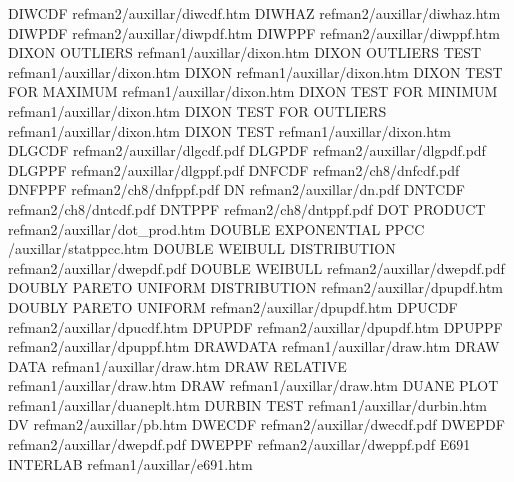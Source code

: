 DIWCDF                                  refman2/auxillar/diwcdf.htm
DIWHAZ                                  refman2/auxillar/diwhaz.htm
DIWPDF                                  refman2/auxillar/diwpdf.htm
DIWPPF                                  refman2/auxillar/diwppf.htm
DIXON OUTLIERS                          refman1/auxillar/dixon.htm
DIXON OUTLIERS TEST                     refman1/auxillar/dixon.htm
DIXON                                   refman1/auxillar/dixon.htm
DIXON TEST FOR MAXIMUM                  refman1/auxillar/dixon.htm
DIXON TEST FOR MINIMUM                  refman1/auxillar/dixon.htm
DIXON TEST FOR OUTLIERS                 refman1/auxillar/dixon.htm
DIXON TEST                              refman1/auxillar/dixon.htm
DLGCDF                                  refman2/auxillar/dlgcdf.pdf
DLGPDF                                  refman2/auxillar/dlgpdf.pdf
DLGPPF                                  refman2/auxillar/dlgppf.pdf
DNFCDF                                  refman2/ch8/dnfcdf.pdf
DNFPPF                                  refman2/ch8/dnfppf.pdf
DN                                      refman2/auxillar/dn.pdf
DNTCDF                                  refman2/ch8/dntcdf.pdf
DNTPPF                                  refman2/ch8/dntppf.pdf
DOT PRODUCT                             refman2/auxillar/dot_prod.htm
DOUBLE EXPONENTIAL PPCC                 /auxillar/statppcc.htm
DOUBLE WEIBULL DISTRIBUTION             refman2/auxillar/dwepdf.pdf
DOUBLE WEIBULL                          refman2/auxillar/dwepdf.pdf
DOUBLY PARETO UNIFORM DISTRIBUTION      refman2/auxillar/dpupdf.htm
DOUBLY PARETO UNIFORM                   refman2/auxillar/dpupdf.htm
DPUCDF                                  refman2/auxillar/dpucdf.htm
DPUPDF                                  refman2/auxillar/dpupdf.htm
DPUPPF                                  refman2/auxillar/dpuppf.htm
DRAWDATA                                refman1/auxillar/draw.htm
DRAW DATA                               refman1/auxillar/draw.htm
DRAW RELATIVE                           refman1/auxillar/draw.htm
DRAW                                    refman1/auxillar/draw.htm
DUANE PLOT                              refman1/auxillar/duaneplt.htm
DURBIN TEST                             refman1/auxillar/durbin.htm
DV                                      refman2/auxillar/pb.htm
DWECDF                                  refman2/auxillar/dwecdf.pdf
DWEPDF                                  refman2/auxillar/dwepdf.pdf
DWEPPF                                  refman2/auxillar/dweppf.pdf
E691 INTERLAB                           refman1/auxillar/e691.htm
